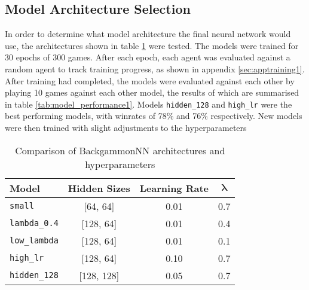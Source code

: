 \subsection{Model Architecture Selection}

In order to determine what model architecture the final neural network would use, the architectures shown in table \ref{tab:architectures} were tested. The models were trained for 30 epochs of 300 games. 
After each epoch, each agent was evaluated against a random agent to track training progress, as shown in appendix \ref{sec:apptraining1}. 
After training had completed, the models were evaluated against each other by playing 10 games against each other model, the results of which are summarised in table \ref{tab:model_performance1}.
Models \texttt{hidden\_128} and \texttt{high\_lr} were the best performing models, with winrates of 78\% and 76\% respectively. New models were then trained with slight adjustments to the hyperparameters


\begin{table}[ht]
    \centering
    \begin{tabular}{lccc}
      \toprule
      \textbf{Model} & \textbf{Hidden Sizes} & \textbf{Learning Rate} & $\boldsymbol{\lambda}$ \\
      \midrule
      \texttt{small}         & [64, 64]     & 0.01 & 0.7 \\
      \texttt{lambda\_0.4}   & [128, 64]    & 0.01 & 0.4 \\
      \texttt{low\_lambda}   & [128, 64]    & 0.01 & 0.1 \\
      \texttt{high\_lr}      & [128, 64]    & 0.10 & 0.7 \\
      \texttt{hidden\_128}   & [128, 128]   & 0.05 & 0.7 \\
      \bottomrule
    \end{tabular}
      \caption{Comparison of BackgammonNN architectures and hyperparameters}
    \label{tab:architectures}
    \vspace{1ex}
\end{table}

